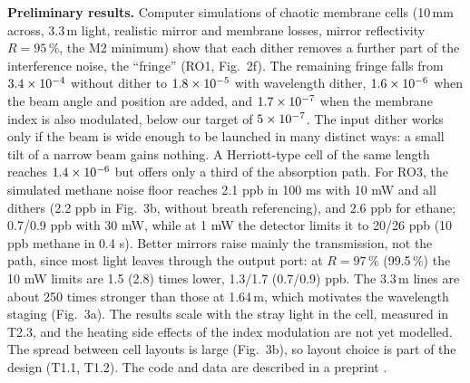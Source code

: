 \documentclass[a4paper,12pt]{article}
\newcommand{\wc}[1]{\textcolor{dkmaroon}{#1}} %
\newcommand{\jc}[1]{\textcolor{dkrust}{#1}} %
\renewcommand{\times}{\mathbin{\text{\texttimes}}}%
\begin{document}
\textbf{Preliminary results.} \jc{Computer simulations of chaotic membrane cells (10\,mm across, 3.3\,\textmu{}m light, realistic mirror and membrane losses\wc{, mirror reflectivity $R=95\,\%$, the M2 minimum}) show that each dither removes a further part of the interference noise, the ``fringe'' (RO1, Fig.~2f). The remaining fringe falls from \wc{$3.4\times10^{-4}$} without dither to $1.8\times10^{-5}$ with wavelength dither, $1.6\times10^{-6}$ when the beam angle and position are added, and \wc{$1.7\times10^{-7}$} when the membrane index is also modulated, below our target of $5\times10^{-7}$. The input dither works only if the beam is wide enough to be launched in many distinct ways: a small tilt of a narrow beam gains nothing. A Herriott-type cell of the same length reaches $1.4\times10^{-6}$ but offers only a third of the absorption path. For RO3, the simulated methane noise floor reaches \wc{2.1 ppb in 100 ms with 10 mW and all dithers (2.2 ppb in Fig.~3b, without breath referencing), and 2.6 ppb for ethane; 0.7/0.9 ppb with 30 mW, while at 1 mW the detector limits it to 20/26 ppb (10 ppb methane in 0.4 s). Better mirrors raise mainly the transmission, not the path, since most light leaves through the output port: at $R=97\,\%$ (99.5\,\%) the 10 mW limits are 1.5 (2.8) times lower, 1.3/1.7 (0.7/0.9) ppb.} The 3.3\,\textmu{}m lines are about 250 times stronger than those at 1.64\,\textmu{}m, which motivates the wavelength staging (Fig.~3a). The results scale with the stray light in the cell, measured in T2.3, and the heating side effects of the index modulation are not yet modelled. The spread between cell layouts is large (Fig.~3b), so layout choice is part of the design (T1.1, T1.2). The code and data are described in a preprint \cite{CMPCpreprint}.}

\end{document}
